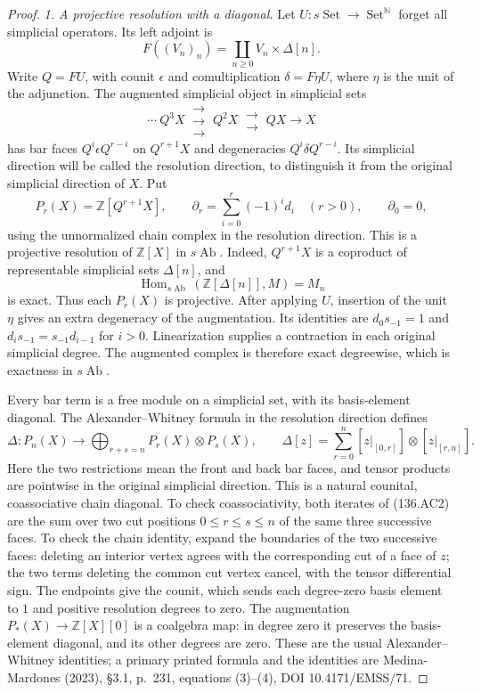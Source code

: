 \begin{proof}
\emph{1. A projective resolution with a diagonal.}
Let $U:s\operatorname{Set}\to\operatorname{Set}^{\mathbb N}$
forget all simplicial operators. Its left adjoint is
\[
             F((V_n)_n)=\coprod_{n\geq0}V_n\times\Delta[n].
\]
Write $Q=FU$, with counit $\epsilon$ and comultiplication
$\delta=F\eta U$, where $\eta$ is the unit of the adjunction.
The augmented simplicial object in simplicial sets
\[
 \cdots\ Q^3X\ \substack{\longrightarrow\\[-5pt]
                         \longrightarrow\\[-5pt]
                         \longrightarrow}\ Q^2X
       \ \substack{\longrightarrow\\[-5pt]\longrightarrow}\ QX
           \longrightarrow X
\]
has bar faces $Q^i\epsilon Q^{r-i}$ on $Q^{r+1}X$ and
degeneracies $Q^i\delta Q^{r-i}$. Its simplicial direction
will be called the resolution direction, to distinguish it
from the original simplicial direction of $X$.
Put
\[
 P_r(X)=\mathbb Z[Q^{r+1}X],\qquad
 \partial_r=\sum_{i=0}^r(-1)^i d_i\quad(r>0),\qquad
 \partial_0=0,
\]
using the unnormalized chain complex in the resolution
direction. This is a projective resolution of
$\mathbb Z[X]$ in $s\operatorname{Ab}$.
Indeed, $Q^{r+1}X$ is a coproduct of representable simplicial
sets $\Delta[n]$, and
\[
 \operatorname{Hom}_{s\operatorname{Ab}}
                   (\mathbb Z[\Delta[n]],M)=M_n
\]
is exact. Thus each $P_r(X)$ is projective. After applying
$U$, insertion of the unit $\eta$ gives an extra degeneracy
of the augmentation. Its identities are
$d_0s_{-1}=1$ and $d_i s_{-1}=s_{-1}d_{i-1}$ for $i>0$.
Linearization supplies a contraction in each original
simplicial degree. The augmented complex is therefore exact
degreewise, which is exactness in $s\operatorname{Ab}$.

Every bar term is a free module on a simplicial set, with
its basis-element diagonal. The Alexander--Whitney formula
in the resolution direction defines
\[
 \Delta:P_n(X)\longrightarrow
               \bigoplus_{r+s=n}P_r(X)\otimes P_s(X),
 \qquad
 \Delta[z]=\sum_{r=0}^n
           [z|_{[0,r]}]\otimes[z|_{[r,n]}].             \tag{136.AC2}
\]
Here the two restrictions mean the front and back bar
faces, and tensor products are pointwise in the original
simplicial direction. This is a natural counital,
coassociative chain diagonal. To check coassociativity,
both iterates of (136.AC2) are the sum over two cut
positions $0\leq r\leq s\leq n$ of the same three
successive faces. To check the chain identity, expand
the boundaries of the two successive faces: deleting
an interior vertex agrees with the corresponding cut
of a face of $z$; the two terms deleting the common
cut vertex cancel, with the tensor differential sign.
The endpoints give the counit, which sends each
degree-zero basis element to $1$ and positive resolution
degrees to zero. The augmentation
$P_*(X)\to\mathbb Z[X][0]$ is a coalgebra map: in
degree zero it preserves the basis-element diagonal,
and its other degrees are zero. These are the usual
Alexander--Whitney identities; a primary printed formula
and the identities are Medina-Mardones (2023), \S3.1,
p.~231, equations (3)--(4), DOI 10.4171/EMSS/71.


\end{proof}
